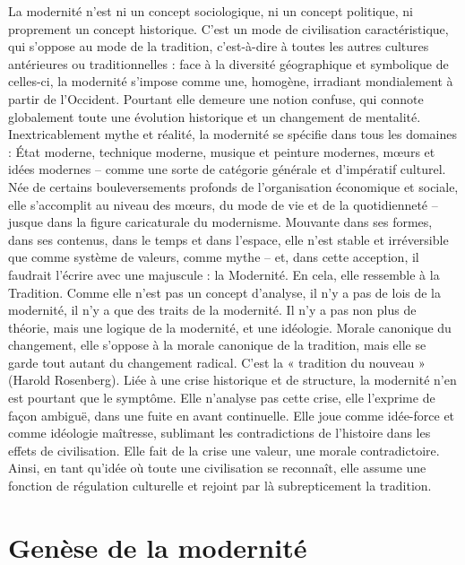 La modernité n'est ni un concept sociologique, ni un concept politique, ni proprement un concept historique. C'est un mode de civilisation caractéristique, qui s'oppose au mode de la tradition, c'est-à-dire à toutes les autres cultures antérieures ou traditionnelles : face à la diversité géographique et symbolique de celles-ci, la modernité s'impose comme une, homogène, irradiant mondialement à partir de l'Occident. Pourtant elle demeure une notion confuse, qui connote globalement toute une évolution historique et un changement de mentalité.
Inextricablement mythe et réalité, la modernité se spécifie dans tous les domaines : État moderne, technique moderne, musique et peinture modernes, mœurs et idées modernes – comme une sorte de catégorie générale et d'impératif culturel. Née de certains bouleversements profonds de l'organisation économique et sociale, elle s'accomplit au niveau des mœurs, du mode de vie et de la quotidienneté – jusque dans la figure caricaturale du modernisme. Mouvante dans ses formes, dans ses contenus, dans le temps et dans l'espace, elle n'est stable et irréversible que comme système de valeurs, comme mythe – et, dans cette acception, il faudrait l'écrire avec une majuscule : la Modernité. En cela, elle ressemble à la Tradition.
Comme elle n'est pas un concept d'analyse, il n'y a pas de lois de la modernité, il n'y a que des traits de la modernité. Il n'y a pas non plus de théorie, mais une logique de la modernité, et une idéologie. Morale canonique du changement, elle s'oppose à la morale canonique de la tradition, mais elle se garde tout autant du changement radical. C'est la
« tradition du nouveau » (Harold Rosenberg). Liée à une crise historique et de structure, la modernité n'en est pourtant que le symptôme. Elle n'analyse pas cette crise, elle l'exprime de façon ambiguë, dans une fuite en avant continuelle. Elle joue comme idée-force et comme idéologie maîtresse, sublimant les contradictions de l'histoire dans les effets de civilisation. Elle fait de la crise une valeur, une morale contradictoire. Ainsi, en tant qu'idée où toute une civilisation se reconnaît, elle assume une fonction de régulation culturelle et rejoint par là subrepticement la tradition.

\section{Genèse de la modernité}


